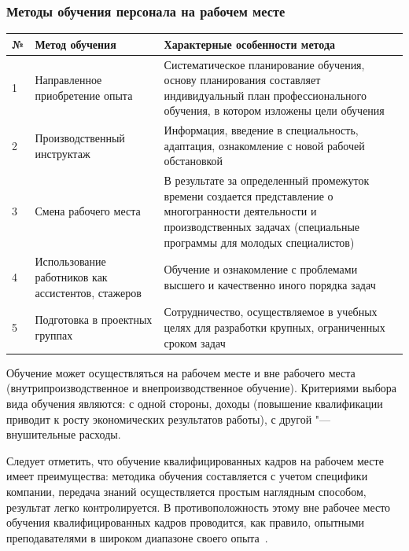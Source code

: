 \documentclass{../industrial-development}
\begin{document}
\begin{frame} \frametitle{Методы обучения персонала на рабочем месте}
  
		\begin{table}[h]
\begin{center}
\begin{tabular}{|p{}|p{4cm}|p{5cm}|}
\hline
\tiny \textbf{№} & \tiny \textbf{Метод обучения} & \tiny \textbf{Характерные особенности метода} \\
\hline
\tiny 1 & \tiny Направленное приобретение опыта & \tiny  Систематическое планирование обучения, основу планирования составляет индивидуальный план профессионального обучения, в котором изложены цели обучения \\
\hline
\tiny 2 &  \tiny Производственный инструктаж & \tiny Информация, введение в специальность, адаптация, ознакомление с новой рабочей обстановкой \\
\hline
\tiny 3 & \tiny Смена рабочего места & \tiny В результате за определенный промежуток времени создается представление о многогранности деятельности и производственных задачах (специальные программы для молодых специалистов) \\
\hline
\tiny 4 & \tiny Использование работников как ассистентов, стажеров & \tiny Обучение и ознакомление с проблемами высшего и качественно иного порядка задач \\
\hline
\tiny 5 & \tiny Подготовка в проектных группах & \tiny Сотрудничество, осуществляемое в учебных целях для разработки крупных, ограниченных сроком задач \\

\hline
\end{tabular}
\end{center}
\end{table}

\end{frame}

\lecturenotes

Обучение может осуществляться на рабочем месте и вне рабочего места (внутрипроизводственное и внепроизводственное обучение). Критериями выбора вида обучения являются: с одной стороны, доходы (повышение квалификации приводит к росту экономических результатов работы), с другой "--- внушительные расходы.

Следует отметить, что обучение квалифицированных кадров на рабочем месте имеет преимущества: методика обучения составляется с учетом специфики компании, передача знаний осуществляется простым наглядным способом, результат легко контролируется. В противоположность этому вне рабочее место обучения квалифицированных кадров проводится, как правило, опытными преподавателями в широком диапазоне своего опыта~\cite[с.~412]{Kibanov}.
\end{document}

